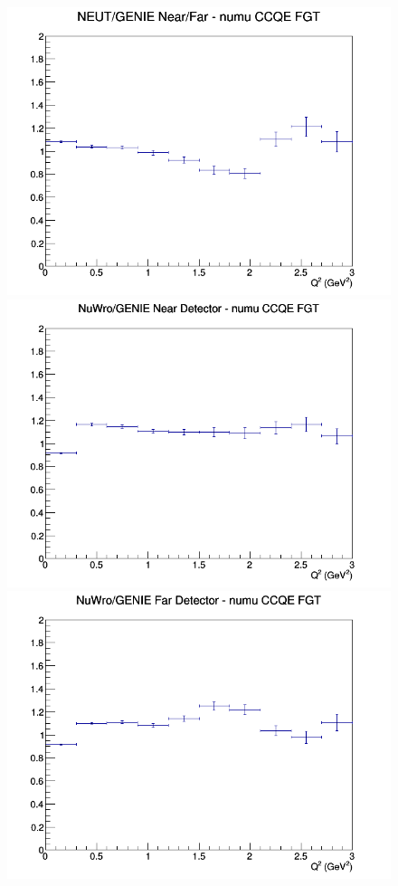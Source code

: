 \documentclass[12pt]{article}
\begin{document}
\begin{figure}[h]
\endminipage
{}
\includegraphics[width=\linewidth]{eff_Q2/FGT/ratios/CCQE_NEUT_GENIE_numu_NF_Q2.png}
\endminipage
\newline
{}
\includegraphics[width=\linewidth]{eff_Q2/FGT/ratios/CCQE_NuWro_GENIE_numu_near_Q2.png}
\endminipage
{}
\includegraphics[width=\linewidth]{eff_Q2/FGT/ratios/CCQE_NuWro_GENIE_numu_far_Q2.png}

\end{figure}
\end{document}
